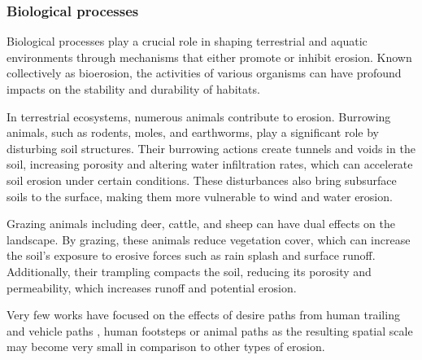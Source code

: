


\subsubsection{Biological processes}
Biological processes play a crucial role in shaping terrestrial and aquatic environments through mechanisms that either promote or inhibit erosion. Known collectively as bioerosion, the activities of various organisms can have profound impacts on the stability and durability of habitats.

In terrestrial ecosystems, numerous animals contribute to erosion. Burrowing animals, such as rodents, moles, and earthworms, play a significant role by disturbing soil structures. Their burrowing actions create tunnels and voids in the soil, increasing porosity and altering water infiltration rates, which can accelerate soil erosion under certain conditions. These disturbances also bring subsurface soils to the surface, making them more vulnerable to wind and water erosion. 

Grazing animals including deer, cattle, and sheep can have dual effects on the landscape. By grazing, these animals reduce vegetation cover, which can increase the soil's exposure to erosive forces such as rain splash and surface runoff. Additionally, their trampling compacts the soil, reducing its porosity and permeability, which increases runoff and potential erosion.

Very few works have focused on the effects of desire paths from human trailing and vehicle paths \cite{Cordonnier2018,Jaiswal2019}, human footsteps \cite{Alvarado2024} or animal paths \cite{Ecormier-Nocca2021} as the resulting spatial scale may become very small in comparison to other types of erosion.

